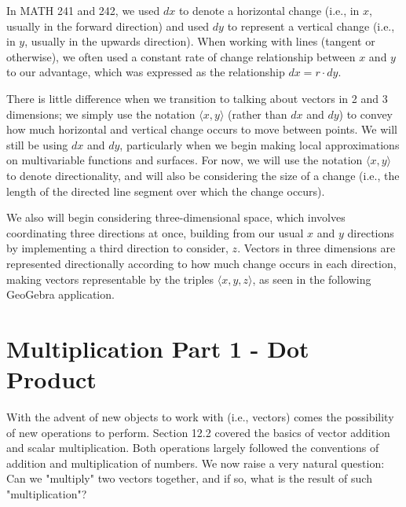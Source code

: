 \documentclass{ximera}
\begin{document}
\begin{center}
\end{center}

In MATH 241 and 242, we used $dx$ to denote a horizontal change (i.e., in $x$, usually in the forward direction) and used $dy$ to represent a vertical change (i.e., in $y$, usually in the upwards direction). When working with lines (tangent or otherwise), we often used a constant rate of change relationship between $x$ and $y$ to our advantage, which was expressed as the relationship $dx=r\cdot dy$.

There is little difference when we transition to talking about vectors in 2 and 3 dimensions; we simply use the notation $\langle x,y\rangle$ (rather than $dx$ and $dy$) to convey how much horizontal and vertical change occurs to move between points. We will still be using $dx$ and $dy$, particularly when we begin making local approximations on multivariable functions and surfaces. For now, we will use the notation $\langle x,y\rangle$ to denote directionality, and will also be considering the size of a change (i.e., the length of the directed line segment over which the change occurs).

We also will begin considering three-dimensional space, which involves coordinating three directions at once, building from our usual $x$ and $y$ directions by implementing a third direction to consider, $z$. Vectors in three dimensions are represented directionally according to how much change occurs in each direction, making vectors representable by the triples $\langle x,y,z\rangle$, as seen in the following GeoGebra application.

\begin{center}
\end{center}


\begin{multipleChoice}
\end{multipleChoice}

\section*{Multiplication Part 1 - Dot Product}

With the advent of new objects to work with (i.e., vectors) comes the possibility of new operations to perform. Section 12.2 covered the basics of vector addition and scalar multiplication. Both operations largely followed the conventions of addition and multiplication of numbers. We now raise a very natural question: Can we "multiply" two vectors together, and if so, what is the result of such "multiplication"?
\end{document}
